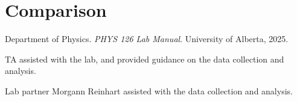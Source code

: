 \documentclass[12pt]{article}
\begin{document}
\section{Comparison}

\renewcommand{\bibname}{5\ \ \References and Acknowledgements}
\begin{thebibliography}{9}
    Department of Physics. \textit{PHYS 126 Lab Manual}. University of Alberta, 2025.

    TA assisted with the lab, and provided guidance on the data collection and analysis.

    Lab partner Morgann Reinhart assisted with the data collection and analysis.
    
\end{thebibliography}
\end{document}
